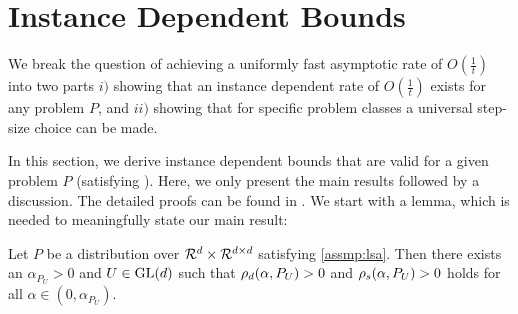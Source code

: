\section{Instance Dependent Bounds}\label{sec:mainresults}
We break the question of achieving a uniformly fast asymptotic rate of $O(\frac{1}{t})$ into two parts $i)$ showing that an instance dependent rate of $O(\frac{1}{t})$ exists for any problem $P$, and $ii)$ showing that for specific problem classes a universal step-size choice can be made. 

In this section, we derive instance dependent bounds that are valid for a given problem $P$ (satisfying ). Here, we only present the main results followed by a discussion. The detailed proofs can be found in . 
We start with a lemma, which is needed to meaningfully state our main result:
\begin{lemma}\label{lm:hur}
Let $P$ be a distribution over $\mathcal{R}^d\times \mathcal{R}^{d \times d}$ satisfying \cref{assmp:lsa}. 
Then there exists an $\alpha_{P_U}>0$ and $U\in \mathrm{GL}(d)$ such that $\rho_d(\alpha,P_U)>0$ and $\rho_s(\alpha,P_U)>0$
holds for all $\alpha \in (0,\alpha_{P_U})$. 
\end{lemma}
\begin{comment}
\begin{proof}
\begin{align*}
\rhos{P}&=\inf_{x:\norm{x}=1}x^* (A_P+A_P^*)x -\alpha x^*\EE{A_t^* A_t} x\\
&=\inf_{x:\norm{x}=1}x^* (A_P+A_P^*)x -\alpha x^* A^*_P A_P -\alpha x^* \EE{M_t^* M_t} x\\
&\geq \lambda_{\min}(A^*_P+A_P)-\alpha \norm{A_P}^2-\sigma^2_P
\end{align*}
The proof is complete by choosing $\alpha_P<\frac{\lambda_{\min}(A^*_P+A_P)}{\norm{A_P}^2+\sigma^2_P}$
\end{proof}
\end{comment}


